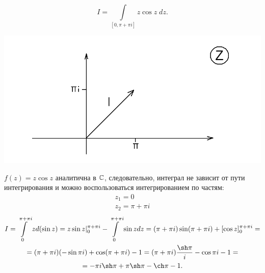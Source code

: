 \documentclass[../../main.tex]{subfiles}
\begin{document}
\begin{example}
	\[I =  \int\limits_{[0, \pi + \pi i]} z \cos z\;dz. \]
	\begin{center}
	\includegraphics[scale = 0.3]{lec31_5.png}
	\end{center}
	$ f(z) = z \cos z $ аналитична в $\mathbb{C}$, следовательно, интеграл не
	зависит от пути интегрирования и можно воспользоваться
	интегрированием по частям:
	\[\begin{gathered}	
	z_1 = 0 \\
	z_2 = \pi + \pi i \end{gathered}\]
	\[\begin{gathered}
	I = \int\limits_{0}^{\pi + \pi i} z d(\sin z) =
	z \sin z |_0^{\pi + \pi i} -
	\int\limits_{0}^{\pi + \pi i} \sin z dz =
	(\pi + \pi i) \sin (\pi + \pi i) + [ \cos z ]_0^{\pi + \pi i} = \\ =
	(\pi + \pi i) ( - \sin \pi i) + \cos (\pi + \pi i) - 1 =
	(\pi + \pi i) \dfrac{\sh \pi}{i} - \cos \pi i - 1 = \\ =
	- \pi i \sh \pi + \pi \sh \pi - \ch \pi - 1.
	\end{gathered} \]
\end{example}
\end{document}
